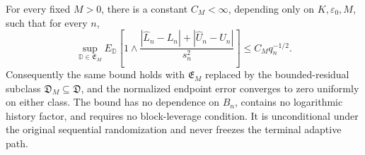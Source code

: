For every fixed \(M>0\), there is a constant \(C_M<\infty\), depending only on \(K,\varepsilon_0,M\), such that for every \(n\),
\[
\sup_{\mathbb D\in\mathfrak E_M}E_{\mathbb D}\left[1\wedge
\frac{|\widehat L_n-L_n|+|\widehat U_n-U_n|}{s_n^2}\right]
\le C_Mq_n^{-1/2}.
\]
Consequently the same bound holds with \(\mathfrak E_M\) replaced by the bounded-residual subclass \(\mathfrak D_M\subseteq\mathfrak D\), and the normalized endpoint error converges to zero uniformly on either class. The bound has no dependence on \(B_n\), contains no logarithmic history factor, and requires no block-leverage condition. It is unconditional under the original sequential randomization and never freezes the terminal adaptive path.